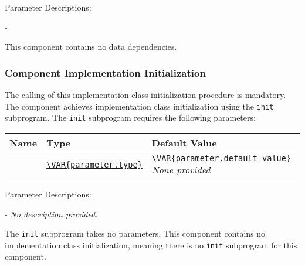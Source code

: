 Parameter Descriptions:
\begin{spaceditemize}
  \item \textbf{\texttt{}} - 
\end{spaceditemize}
\vspace{5mm} %
This component contains no data dependencies.

\subsubsection{Component Implementation Initialization}
The calling of this implementation class initialization procedure is mandatory.
The component achieves implementation class initialization using the \texttt{init} subprogram.
The \texttt{init} subprogram requires the following parameters:

\begin{xltabular}{\textwidth}{ | l | X | X | }
  \hline
  \textbf{Name} & \textbf{Type} & \textbf{Default Value} \\ \hline
  \texttt{} & \texttt{\url{\VAR{parameter.type}}} &
  \texttt{\url{\VAR{parameter.default_value}}}
  \textit{None provided}
  \\ \hline
\end{xltabular}
\vspace{5mm} %

Parameter Descriptions:
\begin{spaceditemize}
  \item \textbf{\texttt{}} - 
    \textit{No description provided.}
\end{spaceditemize}
\vspace{5mm} %
The  \texttt{init} subprogram takes no parameters.
This component contains no implementation class initialization, meaning there is no \texttt{init} subprogram for this component.
